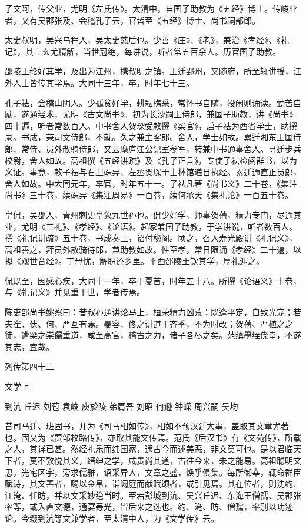 \documentclass[12pt,UTF8]{ctexbook}
\begin{document}
子文阿，传父业，尤明《左氏传》。太清中，自国子助教为《五经》博士。传峻业者，又有吴郡张及、会稽孔子云，官皆至《五经》博士、尚书祠部郎。

太史叔明，吴兴乌程人，吴太史慈后也。少善《庄》、《老》，兼治《孝经》、《礼记》，其三玄尤精解，当世冠绝，每讲说，听者常五百余人。历官国子助教。

邵陵王纶好其学，及出为江州，携叔明之镇。王迁郢州，又随府，所至辄讲授，江外人士皆传其学焉。大同十三年，卒，时年七十三。

孔子袪，会稽山阴人。少孤贫好学，耕耘樵采，常怀书自随，投闲则诵读。勤苦自励，遂通经术，尤明《古文尚书》。初为长沙嗣王侍郎，兼国子助教，讲《尚书》四十遍，听者常数百人。中书舍人贺琛受敕撰《梁官》，启子袪为西省学士，助撰录。书成，兼司文侍郎，不就。久之兼主客郎、舍人，学士如故。累迁湘东王国侍郎、常侍、员外散骑侍郎，又云麾庐江公记室参军，转兼中书通事舍人。寻迁步兵校尉，舍人如故。高祖撰《五经讲疏》及《孔子正言》，专使子袪检阅群书，以为义证。事竟，敕子袪与右卫硃异、左丞贺琛于士林馆递日执经。累迁通直正员郎，舍人如故。中大同元年，卒官，时年五十一。子袪凡著《尚书义》二十卷，《集注尚书》三十卷，续硃异《集注周易》一百卷，续何承天《集礼论》一百五十卷。

皇侃，吴郡人，青州刺史皇象九世孙也。侃少好学，师事贺蒨，精力专门，尽通其业，尤明《三礼》、《孝经》、《论语》。起家兼国子助教，于学讲说，听者数百人。撰《礼记讲疏》五十卷，书成奏上，诏付秘阁。顷之，召入寿光殿讲《礼记义》，高祖善之，拜员外散骑侍郎，兼助教如故。性至孝，常日限诵《孝经》二十遍，以拟《观世音经》。丁母忧，解职还乡里。平西邵陵王钦其学，厚礼迎之。

侃既至，因感心疾，大同十一年，卒于夏首，时年五十八。所撰《论语义》十卷，与《礼记义》并见重于世，学者传焉。

陈吏部尚书姚察曰：昔叔孙通讲论马上，桓荣精力凶荒；既逢平定，自致光宠；若夫崔、伏、何、严互有焉。曼容、佟之讲道于齐季，不为时改；贺蒨、严植之之徒，遭梁之崇儒重道，咸至高官，稽古之力，诸子各尽之矣。范缜墨绖侥幸，不遂其志，宜哉。





列传第四十三

文学上

到沆 丘迟 刘苞 袁峻 庾於陵 弟肩吾 刘昭 何逊 钟嵘 周兴嗣 吴均

昔司马迁、班固书，并为《司马相如传》，相如不预汉廷大事，盖取其文章尤著也。固又为《贾邹枚路传》，亦取其能文传焉。范氏《后汉书》有《文苑传》，所载之人，其详已甚。然经礼乐而纬国家，通古今而述美恶，非文莫可也。是以君临天下者，莫不敦悦其义，缙绅之学，咸贵尚其道，古往今来，未之能易。高祖聪明文思，光宅区宇，旁求儒雅，诏采异人，文章之盛，焕乎俱集。每所御幸，辄命群臣赋诗，其文善者，赐以金帛，诣阙庭而献赋颂者，或引见焉。其在位者，则沈约、江淹、任昉，并以文采妙绝当时。至若彭城到沆、吴兴丘迟、东海王僧孺、吴郡张率等，或入直文德，通宴寿光，皆后来之选也。约、淹、昉、僧孺，率别以功迹论。今缀到沆等文兼学者，至太清中人，为《文学传》云。
\end{document}

